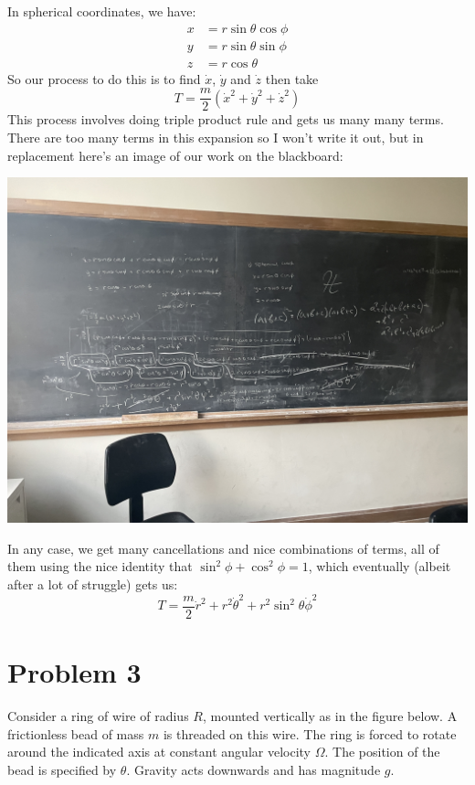 \documentclass[10pt]{article}
\begin{document}
\begin{enumerate}[label=(\alph*)]
            \begin{solution}
                In spherical coordinates, we have:
                \begin{align*}
                    x &= r \sin \theta \cos \phi\\
                    y &= r \sin \theta \sin \phi\\
                    z &= r \cos \theta
                \end{align*}
                So our process to do this is to find $\dot x$, $\dot y$ and $\dot z$ then take 
                \[ T = \frac{m}{2} \left( \dot x^2 + \dot y^2 + \dot z^2\right)\] 
                This process involves doing triple product rule and gets us many many terms. There are too many terms in this expansion so I won't write it out, but in replacement here's an image of our work on the blackboard:
                \begin{center}
                    \includegraphics[scale=0.4, angle=180]{curse.JPG}
                \end{center}
                In any case, we get many cancellations and nice combinations of terms, all of them using the nice identity that $\sin^2 \phi + \cos^2 \phi = 1$, which eventually (albeit after a lot of struggle) gets us:
                \[ T = \frac{m}{2}\dot r^2 + r^2 \dot \theta^2 + r^2 \sin^2 \theta \dot \phi^2\]
            \end{solution}
        \end{enumerate}
    \pagebreak
    \section*{Problem 3}
    Consider a ring of wire of radius $R$, mounted vertically as in the figure below. A frictionless bead of mass $m$ is threaded on this wire. The ring is forced to rotate around the indicated axis at constant angular velocity $\Omega$. The position of the bead is specified by $\theta$. Gravity acts downwards and has magnitude $g$.
\end{document}
